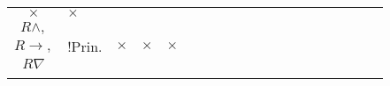 \begin{table}
\begin{tabular}{|c|p{.2cm}|*{17}{p{.4cm}|}}
		\multirow{2}{*}{$\times$} &
		\multirow{2}{*}{$\times$} \\
		$R \lor_2,$ & & & & & & & & & & \caseref{c:ro2-lo} & & & & & & & &\\
		\cline{2-19}
		$R \land,$ & \multirow{3}{*}{\tiny !Prin.} &
		\multirow{3}{*}{$\times$} &
		\multirow{3}{*}{$\times$} &
		\multirow{3}{*}{$\times$} &
		\multirow{3}{*}{\caseref{c:*-lw}} &
		\multirow{3}{*}{\caseref{c:*-lc}} &
		\multirow{3}{*}{\caseref{c:*-cut}} &
		\multirow{3}{*}{\caseref{c:*-la1}} &
		\multirow{3}{*}{\caseref{c:*-la2}} &
		\multirow{3}{*}{\caseref{c:*-lo}} &
		\multirow{3}{*}{\caseref{c:*-ln}} &
		\multirow{3}{*}{\caseref{c:*-li}} &
		\multirow{3}{*}{\caseref{c:*-rw}} &
		\multirow{3}{*}{\caseref{c:*-ra}} &
		\multirow{3}{*}{\caseref{c:*-ro1}} &
		\multirow{3}{*}{\caseref{c:*-ro2}} &
		\multirow{3}{*}{\caseref{c:*-ri}} &
		\multirow{3}{*}{\caseref{c:*-rn}} \\
		$R \rightarrow,$ & & & & & & & & & & & & & & & & & & \\
		$R \nabla$ & & & & & & & & & & & & & & & & & & \\
		\hline
		\multicolumn{2}{|c|}{\slashbox[2.3cm]{$\mathbf{D_0}$}{$\mathbf{D_1}$}} & \rot{$Id$} & \rot{$Ta$} & \rot{$Ex$} & \rot{$Lw$} & \rot{$Lc$} & \rot{$\nabla Cut$} & \rot{$L \land_1$} & \rot{$L \land_2$} & \rot{$L \lor$} & \rot{$L \nabla$} & \rot{$L \rightarrow$} & \rot{$Rw$} & \rot{$R \land$} & \rot{$R \lor_1$} & \rot{$R \lor_2$} & \rot{$R \rightarrow$} & \rot{$R \nabla$} \\
		\hline
	\end{tabular}
\end{table}